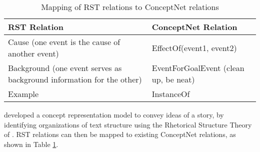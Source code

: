 \begin{table}[ht]   %
\centering
\caption{Mapping of RST relations to ConceptNet relations} \vspace{0.25em}
\begin{tabular}{|p{7cm}|l|} \hline
RST Relation & ConceptNet Relation \\ \hline
Cause (one event is the cause of another event) & EffectOf(event1, event2) \\ \hline
Background (one event serves as background information for the other) & EventForGoalEvent (clean up, be neat) \\ \hline
Example & InstanceOf \\ \hline
\end{tabular}
\label{tab:mappingrstconceptnet}
\end{table}

 developed a concept representation model to convey ideas of a story, by identifying organizations of text structure using the Rhetorical Structure Theory of . RST relations can then be mapped to existing ConceptNet relations, as shown in Table \ref{tab:mappingrstconceptnet}.





